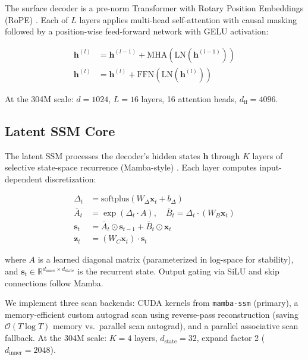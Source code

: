 \documentclass{article}
\begin{document}
The surface decoder is a pre-norm Transformer \citep{xiong2020layer} with
Rotary Position Embeddings (RoPE) \citep{su2024roformer}. Each of $L$ layers
applies multi-head self-attention with causal masking followed by a
position-wise feed-forward network with GELU activation:

\begin{align}
\mathbf{h}^{(l)} &= \mathbf{h}^{(l-1)} + \text{MHA}(\text{LN}(\mathbf{h}^{(l-1)})) \\
\mathbf{h}^{(l)} &= \mathbf{h}^{(l)} + \text{FFN}(\text{LN}(\mathbf{h}^{(l)}))
\end{align}

At the 304M scale: $d = 1024$, $L = 16$ layers, 16 attention heads, $d_\text{ff} = 4096$.

\subsection{Latent SSM Core}
\label{sec:ssm}

The latent SSM processes the decoder's hidden states $\mathbf{h}$ through $K$
layers of selective state-space recurrence (Mamba-style) \citep{gu2023mamba}.
Each layer computes input-dependent discretization:

\begin{align}
\Delta_t &= \text{softplus}(W_\Delta \mathbf{x}_t + b_\Delta) \\
\bar{A}_t &= \exp(\Delta_t \cdot A), \quad \bar{B}_t = \Delta_t \cdot (W_B \mathbf{x}_t) \\
\mathbf{s}_t &= \bar{A}_t \odot \mathbf{s}_{t-1} + \bar{B}_t \odot \mathbf{x}_t \\
\mathbf{z}_t &= (W_C \mathbf{x}_t) \cdot \mathbf{s}_t
\end{align}

where $A$ is a learned diagonal matrix (parameterized in log-space for
stability), and $\mathbf{s}_t \in \mathbb{R}^{d_\text{inner} \times d_\text{state}}$ is the recurrent state. Output gating via SiLU and skip connections follow Mamba.

We implement three scan backends: CUDA kernels from \texttt{mamba-ssm} (primary), a memory-efficient custom autograd scan using reverse-pass reconstruction (saving $\mathcal{O}(T \log T)$ memory vs.\ parallel scan autograd), and a parallel associative scan fallback. At the 304M scale: $K=4$ layers, $d_\text{state}=32$, expand factor 2 ($d_\text{inner}=2048$).
\end{document}
